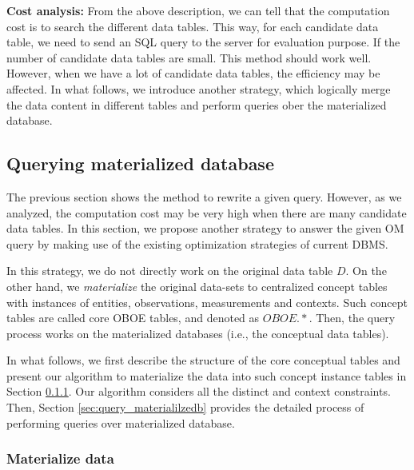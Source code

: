 \documentclass[conference]{IEEEtran}
\begin{document}
{\bf Cost analysis:} 
From the above description, we can tell that the computation cost is to search the different data
tables. This way, for each candidate data table, we need to send an
SQL query to the server for evaluation purpose.
If the number of candidate data tables are small. This method should
work well. However, when we have a lot of candidate data tables, the
efficiency may be affected. 
In what follows, we introduce another strategy, which logically merge
the data content in different tables and perform queries ober the
materialized database. 

\subsection{Querying materialized database}\label{sec:matdb}

The previous section shows the method to rewrite a given query. 
However, as we analyzed, the computation cost may be very high when
there are many candidate data tables. 
In this section, we propose another strategy to answer the given OM
query by making use of the existing optimization strategies of
current DBMS. 

In this strategy, we do not directly work on the original data table
$D$. On the other hand, we {\em materialize} the original data-sets to
centralized concept tables with instances of entities, observations, measurements
and contexts. Such concept tables are called core OBOE tables, and denoted as
$OBOE.*$. 
Then, the query process works on the materialized databases (i.e., the
conceptual data tables). 

In what follows, we first describe the structure of the core
conceptual tables and present our algorithm to materialize the data into such
concept instance tables in Section \ref{sec:materialilzedb}. Our
algorithm considers all the distinct and context constraints. 
Then, Section \ref{sec:query_materialilzedb} provides the detailed
process of performing queries over materialized database. 

\subsubsection{Materialize data}\label{sec:materialilzedb}
\end{document}
